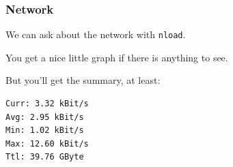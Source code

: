\begin{frame}[fragile]
\frametitle{Network}


\begin{changemargin}{1cm}
We can ask about the network with \texttt{nload}. 
 
You get a nice little graph if there is anything to see. 

But you'll get the summary, at least:

\begin{verbatim}
Curr: 3.32 kBit/s
Avg: 2.95 kBit/s
Min: 1.02 kBit/s
Max: 12.60 kBit/s
Ttl: 39.76 GByte                                                                                       \end{verbatim}
\end{changemargin}
\end{frame}


